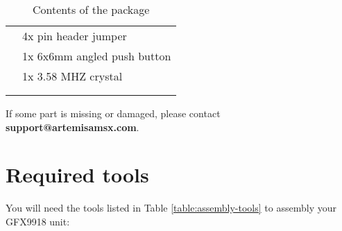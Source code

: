 \begin{longtable}{m{10mm}|l}
	                                      & 4x pin header jumper                                        \\
	                                      & 1x 6x6mm angled push button                                 \\
	                                      & 1x 3.58 MHZ crystal                                         \\
	                                      &                                                             \\
	\caption{Contents of the package}
	\label{table:package-contents}
\end{longtable}

If some part is missing or damaged, please contact {\bf support@artemisamsx.com}.

\section{Required tools}

You will need the tools listed in Table \ref{table:assembly-tools} to assembly your GFX9918 unit:

